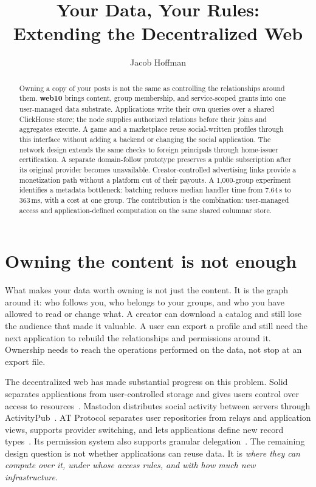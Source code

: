 \documentclass[sigconf, nonacm]{acmart}
\title{Your Data, Your Rules: \\ Extending the Decentralized Web}
\author{Jacob Hoffman}
\affiliation{\institution{web10 Inc.}\country{}}
\begin{document}
\begin{abstract}
Owning a copy of your posts is not the same as controlling the
relationships around them. \textbf{web10} brings content, group membership,
and service-scoped grants into one user-managed data substrate.
Applications write their own queries over a shared ClickHouse store;
the node supplies authorized relations before their joins and aggregates
execute. A game and a marketplace reuse social-written profiles through
this interface without adding a backend or changing the social application.
The network design extends the same checks to foreign principals through
home-issuer certification. A separate domain-follow prototype preserves a
public subscription after its original provider becomes unavailable.
Creator-controlled advertising links provide a monetization path without
a platform cut of their payouts. A 1,000-group experiment identifies a
metadata bottleneck: batching reduces median handler time from 7.64\,s
to 363\,ms, with a cost at one group. The contribution is the combination:
user-managed access and application-defined computation on the same
shared columnar store.
\end{abstract}
\maketitle

\section{Owning the content is not enough}
\label{sec:intro}

What makes your data worth owning is not just the content. It is the
graph around it: who follows you, who belongs to your groups, and who
you have allowed to read or change what. A creator can download a
catalog and still lose the audience that made it valuable. A user can
export a profile and still need the next application to rebuild the
relationships and permissions around it. Ownership needs to reach the
operations performed on the data, not stop at an export file.

The decentralized web has made substantial progress on this problem.
Solid separates applications from user-controlled storage and gives
users control over access to resources~\cite{solid2016,solid-protocol2024}.
Mastodon distributes social activity between servers through
ActivityPub~\cite{activitypub2018}. AT Protocol separates user repositories
from relays and application views, supports provider switching, and lets
applications define new record types~\cite{kleppmann2024,at-statusphere}.
Its permission system also supports granular delegation~\cite{at-permissions}.
The remaining design question is not whether applications can reuse
data. It is \emph{where they can compute over it, under whose access
rules, and with how much new infrastructure}.
\end{document}
